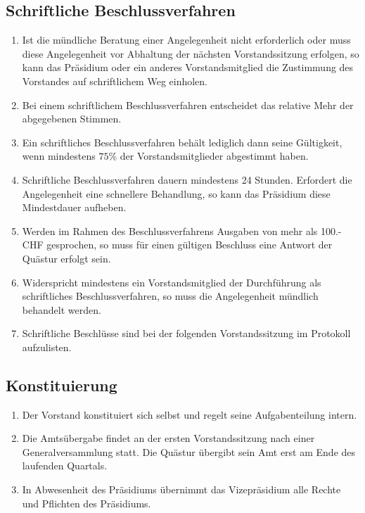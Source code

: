 \subsection{Schriftliche Beschlussverfahren}
\begin{enumerate}
\item Ist die mündliche Beratung einer Angelegenheit nicht erforderlich oder muss diese Angelegenheit vor Abhaltung der nächsten Vorstandssitzung erfolgen, so kann das Präsidium oder ein anderes Vorstandsmitglied die Zustimmung des Vorstandes auf schriftlichem Weg einholen.
\item Bei einem schriftlichem Beschlussverfahren entscheidet das relative Mehr der abgegebenen Stimmen.
\item Ein schriftliches Beschlussverfahren behält lediglich dann seine Gültigkeit, wenn mindestens $75\%$ der Vorstandsmitglieder abgestimmt haben.
\item Schriftliche Beschlussverfahren dauern mindestens 24 Stunden. Erfordert die Angelegenheit eine schnellere Behandlung, so kann das Präsidium diese Mindestdauer aufheben.
\item Werden im Rahmen des Beschlussverfahrens Ausgaben von mehr als 100.- CHF gesprochen, so muss für einen gültigen Beschluss eine Antwort der Quästur erfolgt sein.
\item Widerspricht mindestens ein Vorstandsmitglied der Durchführung als schriftliches Beschlussverfahren, so muss die Angelegenheit mündlich behandelt werden.
\item Schriftliche Beschlüsse sind bei der folgenden Vorstandssitzung im Protokoll aufzulisten.
\end{enumerate}

\subsection{Konstituierung}
\begin{enumerate}
\item Der Vorstand konstituiert sich selbst und regelt seine Aufgabenteilung intern.
\item Die Amtsübergabe findet an der ersten Vorstandssitzung nach einer Generalversammlung statt. Die Quästur übergibt sein Amt erst am Ende des laufenden Quartals.
\item In Abwesenheit des Präsidiums übernimmt das Vizepräsidium alle Rechte und Pflichten des Präsidiums.
\end{enumerate}

